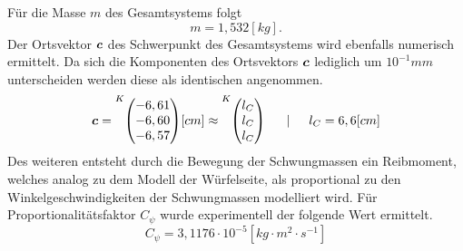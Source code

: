 Für die Masse $m$ des Gesamtsystems folgt
\begin{equation}
m = 1,532[kg].
\end{equation}
Der Ortsvektor $\boldsymbol{c}$ des Schwerpunkt des Gesamtsystems wird ebenfalls numerisch ermittelt. Da sich die Komponenten des Ortsvektors $\boldsymbol{c}$ lediglich um $10^{-1}mm$ unterscheiden werden diese als identischen angenommen.
\begin{equation}
\bs{c} = \vecBS{K}{-6,61}{-6,60}{-6,57}[cm] \approx \vecBS{K}{l_C}{l_C}{l_C} \hspace{15pt} \vert \hspace{15pt} l_C = 6,6[cm]
\end{equation}
Des weiteren entsteht durch die Bewegung der Schwungmassen ein Reibmoment, welches analog zu dem Modell der Würfelseite, als proportional zu den Winkelgeschwindigkeiten der Schwungmassen modelliert wird. Für Proportionalitätsfaktor $C_{\psi}$ wurde experimentell der folgende Wert ermittelt.
\begin{equation}
C_{\psi} = 3,1176\cdot 10^{-5}[kg\cdot m^2 \cdot s^{-1}]
\end{equation}